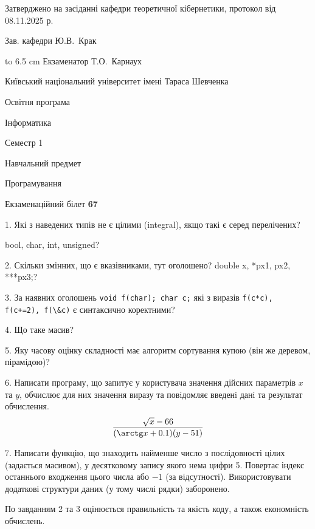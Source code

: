 \documentclass[12pt, ukrainian]{article}
\def\code#1{\Verb!#1!}
\begin{document}
{\smallskip\smallskip \begin {scriptsize} Затверджено на засіданні кафедри теоретичної кібернетики, протокол   від   08.11.2025 р.\par\smallskip\smallskip\smallskip\smallskip
{\parbox {6.5 cm} {Зав. кафедри \dotfill Ю.В.~Крак}}\hspace {0.7cm} {\hbox to 6.5 cm { Екзаменатор \dotfill Т.О.~Карнаух}} \end{scriptsize}}
\newpage
{{\begin {scriptsize}\par
{ \center  Київський національний університет імені Тараса Шевченка \par}
{\parbox {5 cm}{Освітня програма \hfill}{\parbox {7 cm}{Інформатика\hfill}}\parbox {6 cm}{\hfill Семестр 1}}\par
{\parbox {5 cm} {Навчальний предмет \hfill}\parbox {7 cm}{Програмування \hfill}\parbox {6cm}{\hfill}\par}\vspace{-15pt} \end{scriptsize}}{\center Екзаменаційний білет \No \textbf { 67 }\par}}
{%
1. Які з наведених типів не є цілими (integral), якщо такі є серед перелічених?

bool, char, int, unsigned?
\par
\vspace{2mm}
2. Скільки змінних, що є вказівниками, тут оголошено?
double x, *px1, px2, ***px3;?
\par
\vspace{2mm}
3. За наявних оголошень \code{void f(char); char c;} які з виразів \code{f(c*c), f(c+=2), f(\&c)} є синтаксично коректними?
\par
\vspace{2mm}
4. Що таке масив?
\par
\vspace{2mm}
5. Яку часову оцінку складності має алгоритм сортування купою (він же деревом, пірамідою)?
\par
\vspace{2mm}
6. Написати програму, що запитує у користувача значення дійсних параметрів $x$ та $y$, обчислює для них значення виразу та повiдомляє введенi данi та результат обчислення.
$$\frac{\sqrt x - 66}{(\arctg x + 0.1) (y - 51)}$$ 

\par
7. Написати функцію, що знаходить найменше число з послідовності цілих (задається масивом), у десятковому запису якого нема цифри 5. Повертає індекс останнього входження цього числа або $-1$ (за відсутності). Використовувати додаткові структури даних (у тому числі рядки) заборонено.

По завданням 2 та 3 оцінюється правильність та якість коду, а також економність обчислень.

}
\end{document}
